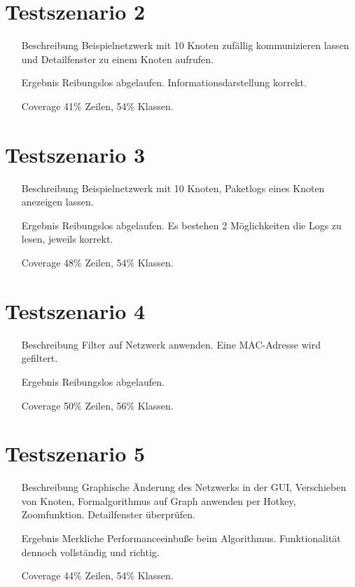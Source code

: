 \section{Testszenario 2}

\begin{enumerate}[leftmargin = *, align=parleft, labelsep=3cm]
  \item[Beschreibung] Beispielnetzwerk mit 10 Knoten zufällig kommunizieren lassen und Detailfenster zu einem Knoten aufrufen.
  \item[Ergebnis] Reibungslos abgelaufen. Informationsdarstellung korrekt.
  \item[Coverage] 41\% Zeilen, 54\% Klassen.
\end{enumerate}

\section{Testszenario 3}

\begin{enumerate}[leftmargin = *, align=parleft, labelsep=3cm]
  \item[Beschreibung] Beispielnetzwerk mit 10 Knoten, Paketlogs eines Knoten anezeigen lassen.
  \item[Ergebnis] Reibungslos abgelaufen. Es bestehen 2 Möglichkeiten die Logs zu lesen, jeweils korrekt.
  \item[Coverage] 48\% Zeilen, 54\% Klassen.
\end{enumerate}

\section{Testszenario 4}

\begin{enumerate}[leftmargin = *, align=parleft, labelsep=3cm]
  \item[Beschreibung] Filter auf Netzwerk anwenden. Eine MAC-Adresse wird gefiltert.
  \item[Ergebnis] Reibungslos abgelaufen.
  \item[Coverage] 50\% Zeilen, 56\% Klassen.
\end{enumerate}

\section{Testszenario 5}

\begin{enumerate}[leftmargin = *, align=parleft, labelsep=3cm]
  \item[Beschreibung] Graphische Änderung des Netzwerks in der GUI, Verschieben von Knoten, Formalgorithmus auf Graph anwenden per Hotkey, Zoomfunktion. Detailfenster überprüfen.
  \item[Ergebnis] Merkliche Performanceeinbuße beim Algorithmus. Funktionalität dennoch vollständig und richtig.
  \item[Coverage] 44\% Zeilen, 54\% Klassen.
\end{enumerate}

